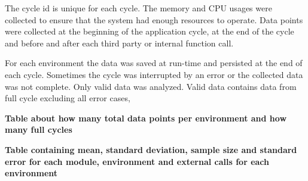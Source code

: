 The cycle id is unique for each cycle.
The memory and CPU usages were collected to ensure that the system had enough resources to operate.
Data points were collected at the beginning of the application cycle, at the end of the cycle and before and after each third party or internal function call.

For each environment the data was saved at run-time and persisted at the end of each cycle.
Sometimes the cycle was interrupted by an error or the collected data was not complete.
Only valid data was analyzed.
Valid data contains data from full cycle excluding all error cases,

\textbf{Table about how many total data points per environment and how many full cycles}

\textbf{Table containing mean, standard deviation, sample size and standard error for each module, environment and external calls for each environment}












